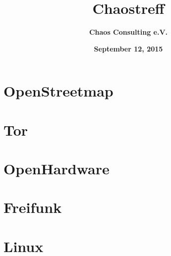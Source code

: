 \documentclass[10pt,foldmark,tumble]{leaflet}
\title{\bf Chaostreff}
\author{\Large \bf Chaos Consulting e.V.}
\date{\bf September 12, 2015 }
\begin{document}
\hfill
\clearpage

\section{OpenStreetmap}
\blindtext

\section{Tor}
\blindtext

\section{OpenHardware}
\blindtext

\section{Freifunk}
\blindtext

\section{Linux}
\blindtext
\end{document}
